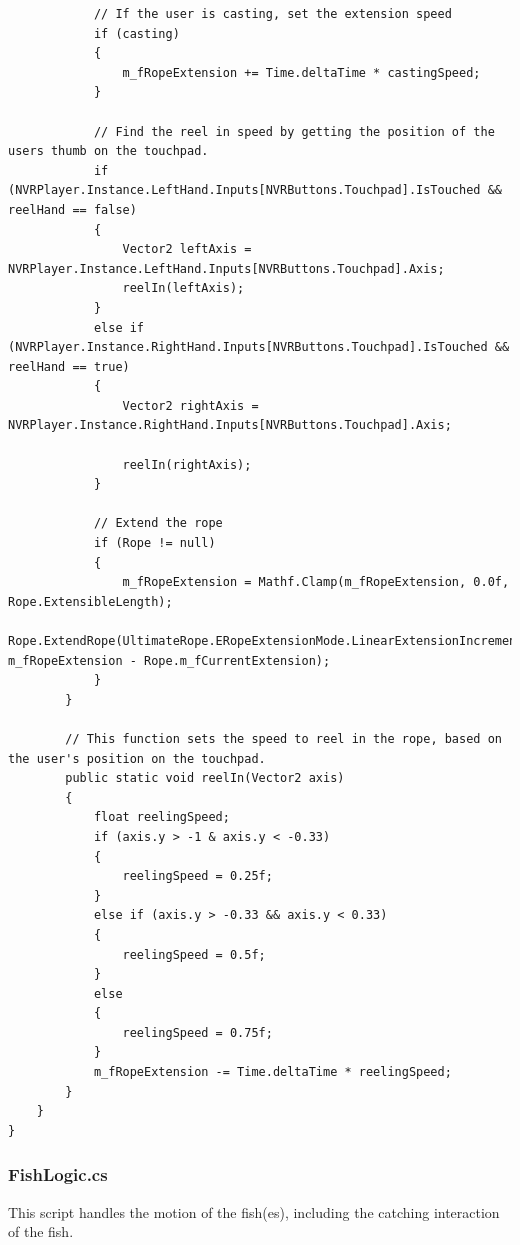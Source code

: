 \documentclass[10pt,journal,compsoc,onecolumn, draftclsnofoot]{IEEEtran}
\begin{document}
\begin{verbatim}
            // If the user is casting, set the extension speed
            if (casting)
            {
                m_fRopeExtension += Time.deltaTime * castingSpeed;
            }

            // Find the reel in speed by getting the position of the users thumb on the touchpad.
            if (NVRPlayer.Instance.LeftHand.Inputs[NVRButtons.Touchpad].IsTouched && reelHand == false)
            {
                Vector2 leftAxis = NVRPlayer.Instance.LeftHand.Inputs[NVRButtons.Touchpad].Axis;
                reelIn(leftAxis);
            }
            else if (NVRPlayer.Instance.RightHand.Inputs[NVRButtons.Touchpad].IsTouched && reelHand == true)
            {
                Vector2 rightAxis = NVRPlayer.Instance.RightHand.Inputs[NVRButtons.Touchpad].Axis;

                reelIn(rightAxis);
            }

            // Extend the rope
            if (Rope != null)
            {
                m_fRopeExtension = Mathf.Clamp(m_fRopeExtension, 0.0f, Rope.ExtensibleLength);
                Rope.ExtendRope(UltimateRope.ERopeExtensionMode.LinearExtensionIncrement, m_fRopeExtension - Rope.m_fCurrentExtension);
            }
        }

        // This function sets the speed to reel in the rope, based on the user's position on the touchpad.
        public static void reelIn(Vector2 axis)
        {
            float reelingSpeed;
            if (axis.y > -1 & axis.y < -0.33)
            {
                reelingSpeed = 0.25f;
            }
            else if (axis.y > -0.33 && axis.y < 0.33)
            {
                reelingSpeed = 0.5f;
            }
            else
            {
                reelingSpeed = 0.75f;
            }
            m_fRopeExtension -= Time.deltaTime * reelingSpeed;
        }
    }
}
\end{verbatim}

\subsubsection{FishLogic.cs}
This script handles the motion of the fish(es), including the catching interaction of the fish.\\
\end{document}
